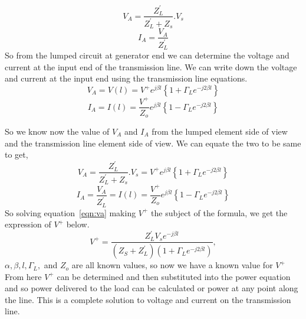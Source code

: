 \begin{equation}
V_A = \frac{Z^'_L}{Z^{'}_L + Z_s} . V_s
\end{equation}
\begin{equation}
I_A = \frac{V_A}{Z^{'}_L}
\end{equation} 
So from the lumped circuit at generator end we can determine the voltage and current at the input end of the transmission line. We can write down the voltage and current at the input end using the transmission line equations.
\begin{equation*} 
V_A= V(l) = V^+ e^{j\beta l} \left\lbrace 1 + \Gamma_L e^{-j2\beta l} \right\rbrace 
\end{equation*} 
\begin{equation*}
I_A = I(l) = \frac{V^+}{Z_o} e^{j\beta l} \left\lbrace 1 - \Gamma_L e^{-j2\beta l} \right\rbrace
\end{equation*}

So we know now the value of $V_A$ and $I_A$ from the lumped element side of view and the transmission line element side of view. We can equate the two to be same to get,
\begin{equation} 
V_A = \frac{Z^{'}_L}{Z^{'}_L + Z_s} . V_s = V^+ e^{j\beta l} \left\lbrace 1 + \Gamma_L e^{-j2\beta l} \right\rbrace 
\end{equation}
\begin{equation}
I_A = \frac{V_A}{Z^{'}_L} = I(l) = \frac{V^+}{Z_o} e^{j\beta l} \left\lbrace 1 - \Gamma_L e^{-j2\beta l} \right\rbrace
\end{equation}
So solving equation~\eqref{eqn:va} making $V^{+}$ the subject of the formula, we get the expression of $V^+$ below. 
\begin{equation} 
V^+ = \frac{Z^{'}_L V_s e^{-j\beta l}}{(Z_S + Z^{'}_L)(1 + \Gamma_L e^{-j2\beta l })}, 
\end{equation}
$\alpha, \beta , l  , \Gamma_L,$ and $Z_o$ are all known values, so now we have a known value for $V^+$\\

From here $V^+$ can be determined and then substituted into the power equation and so power delivered to the load can be calculated or power at any point along the line. This is a complete solution to voltage and current on the transmission line.

